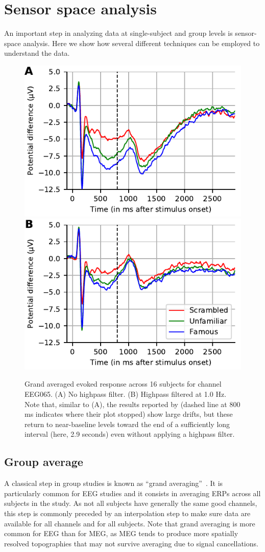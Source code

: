 \section{Sensor space analysis}
An important step in analyzing data at single-subject and group levels is sensor-space analysis. Here we show how several different techniques can be employed to understand the data.

\begin{figure}[t]
  \includegraphics[width=0.49\linewidth]{figures/grand_average_highpass-NoneHz.pdf}
  \includegraphics[width=0.49\linewidth]{figures/grand_average_highpass-1Hz.pdf}
\caption[Grand averaged evoked response across 16 subjects.]{Grand averaged evoked response across 16 subjects for channel EEG065.
(A) No highpass filter. (B) Highpass filtered at 1.0 Hz. Note that, similar to (A), the results reported by \cite{wakeman2015multi} (dashed line at 800 ms indicates where their plot stopped) show large drifts, but these return to near-baseline levels toward the end of a sufficiently long interval (here, 2.9 seconds) even without applying a highpass filter.}
\label{fig:grand_average}
\end{figure}  

\subsection{Group average}

A classical step in group studies is known as ``grand averaging''~\citep{delorme-etal:15}. It is particularly common for EEG studies and it consists in averaging ERPs across all subjects in the study. As not all subjects have generally the same good channels, this step is commonly preceded by an interpolation step to make sure data are available for all channels and for all subjects. Note that grand averaging is more common for EEG than for MEG, as MEG tends to produce more spatially resolved topographies that may not survive averaging due to signal cancellations.

